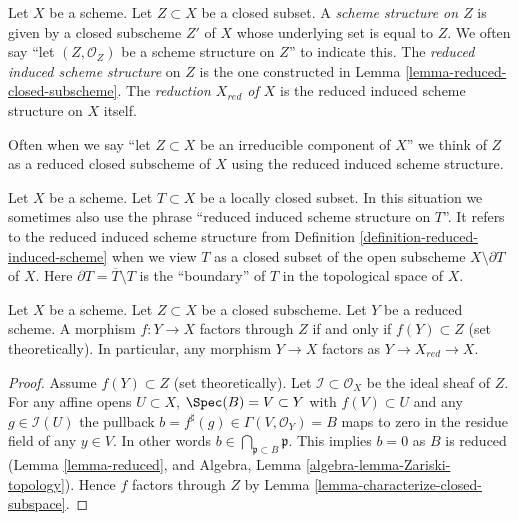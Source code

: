 \begin{definition}
\label{definition-reduced-induced-scheme}
Let $X$ be a scheme. Let $Z \subset X$ be a closed subset.
A {\it scheme structure on $Z$} is given by a closed subscheme $Z'$ of
$X$ whose underlying set is equal to $Z$. We often say
``let $(Z, \mathcal{O}_Z)$ be a scheme structure on $Z$'' to
indicate this. The {\it reduced induced scheme structure}
on $Z$ is the one constructed in Lemma \ref{lemma-reduced-closed-subscheme}.
The {\it reduction $X_{red}$ of $X$} is the reduced induced scheme
structure on $X$ itself.
\end{definition}

\noindent
Often when we say ``let $Z \subset X$ be an irreducible component of $X$''
we think of $Z$ as a reduced closed subscheme of $X$ using the reduced induced
scheme structure.

\begin{remark}
\label{remark-reduced-induced-locally-closed}
Let $X$ be a scheme. Let $T \subset X$ be a locally closed subset.
In this situation we sometimes also use the phrase
``reduced induced scheme structure on $T$''. It refers
to the reduced induced scheme structure from
Definition \ref{definition-reduced-induced-scheme}
when we view $T$ as a closed subset of the open subscheme 
$X \setminus \partial T$ of $X$. Here
$\partial T = \overline{T} \setminus T$ is the ``boundary'' of $T$
in the topological space of $X$.
\end{remark}

\begin{lemma}
\label{lemma-map-into-reduction}
Let $X$ be a scheme.
Let $Z \subset X$ be a closed subscheme.
Let $Y$ be a reduced scheme.
A morphism $f : Y \to X$ factors through $Z$ if and only if
$f(Y) \subset Z$ (set theoretically). In particular, any
morphism $Y \to X$ factors as $Y \to X_{red} \to X$.
\end{lemma}

\begin{proof}
Assume $f(Y) \subset Z$ (set theoretically).
Let $\mathcal{I} \subset \mathcal{O}_X$ be the ideal sheaf of $Z$.
For any affine opens $U \subset X$, $\Spec(B) = V \subset Y$
with $f(V) \subset U$ and any $g \in \mathcal{I}(U)$
the pullback $b = f^\sharp(g) \in \Gamma(V, \mathcal{O}_Y) = B$
maps to zero in the residue field of any $y \in V$.
In other words $b \in \bigcap_{\mathfrak p \subset B} \mathfrak p$.
This implies $b = 0$ as $B$ is reduced (Lemma \ref{lemma-reduced}, and
Algebra, Lemma \ref{algebra-lemma-Zariski-topology}).
Hence $f$ factors through
$Z$ by Lemma \ref{lemma-characterize-closed-subspace}.
\end{proof}










